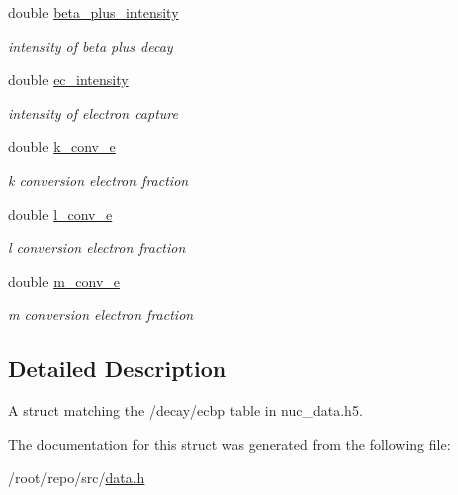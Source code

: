 \begin{DoxyCompactItemize}
\mbox{\label{structpyne_1_1ecbp_adafb0b96525249576ccc33302c452fe8}} 
double \hyperlink{structpyne_1_1ecbp_adafb0b96525249576ccc33302c452fe8}{beta\+\_\+plus\+\_\+intensity}
\begin{DoxyCompactList}\small\item\em intensity of beta plus decay \end{DoxyCompactList}\item 
\mbox{\label{structpyne_1_1ecbp_a67128407e1bd8eb131b7b2764a6813d8}} 
double \hyperlink{structpyne_1_1ecbp_a67128407e1bd8eb131b7b2764a6813d8}{ec\+\_\+intensity}
\begin{DoxyCompactList}\small\item\em intensity of electron capture \end{DoxyCompactList}\item 
\mbox{\label{structpyne_1_1ecbp_a3bb382193d514ddbda7baf4796a025d5}} 
double \hyperlink{structpyne_1_1ecbp_a3bb382193d514ddbda7baf4796a025d5}{k\+\_\+conv\+\_\+e}
\begin{DoxyCompactList}\small\item\em k conversion electron fraction \end{DoxyCompactList}\item 
\mbox{\label{structpyne_1_1ecbp_a4de2fa13e0520b5fd840cc53ad8f52dd}} 
double \hyperlink{structpyne_1_1ecbp_a4de2fa13e0520b5fd840cc53ad8f52dd}{l\+\_\+conv\+\_\+e}
\begin{DoxyCompactList}\small\item\em l conversion electron fraction \end{DoxyCompactList}\item 
\mbox{\label{structpyne_1_1ecbp_afed47f1b2eea323a4de63f67fdd236c6}} 
double \hyperlink{structpyne_1_1ecbp_afed47f1b2eea323a4de63f67fdd236c6}{m\+\_\+conv\+\_\+e}
\begin{DoxyCompactList}\small\item\em m conversion electron fraction \end{DoxyCompactList}\end{DoxyCompactItemize}


\subsection{Detailed Description}
A struct matching the \textquotesingle{}/decay/ecbp\textquotesingle{} table in nuc\+\_\+data.\+h5. 

The documentation for this struct was generated from the following file\+:\begin{DoxyCompactItemize}
\item 
/root/repo/src/\hyperlink{data_8h}{data.\+h}\end{DoxyCompactItemize}
